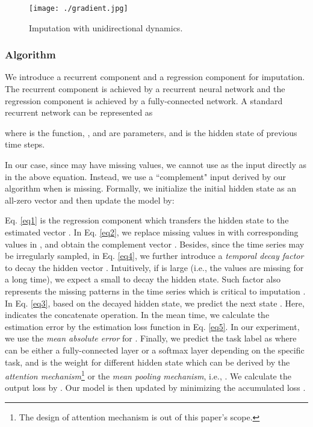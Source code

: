 \documentclass{article}
\begin{document}
\begin{figure}[t!]
\centering
\texttt{[image: ./gradient.jpg]}
\caption{Imputation with unidirectional dynamics.}
\label{fig:backpropagate}
\end{figure}



\subsubsection{Algorithm}
We introduce a recurrent component and a regression component for imputation. The recurrent component is achieved by a recurrent neural network and the regression component is achieved by a fully-connected network.
A standard recurrent network \cite{DeepBook} can be represented as 

where  is the  function, ,  and  are parameters, and  is the hidden state of previous time steps.

In our case, since  may have missing values, we cannot use  as the input directly as in the above equation. Instead,  we use a ``complement" input  derived by our algorithm when  is missing. Formally,
we  initialize the initial hidden state  as an all-zero vector and then update the model by: 


Eq. \eqref{eq1} is the regression component which transfers the hidden state  to the estimated vector . In Eq. \eqref{eq2}, we replace missing values in  with corresponding values in , and obtain the complement vector . Besides, since the time series may be irregularly sampled, in Eq. \eqref{eq4}, we further introduce a {\em temporal decay factor}  to decay the hidden vector . Intuitively, if  is large (i.e., the values are missing for a long time), we expect a small  to decay the hidden state.
Such factor also represents the missing patterns in the time series which is critical to imputation \cite{che2018recurrent}. In Eq. \eqref{eq3}, based on the decayed hidden state, we predict the next state . Here, 
 indicates the concatenate operation.
In the mean time, we calculate the estimation error by the estimation loss function  in Eq. \eqref{eq5}. In our experiment, we use the {\em mean absolute error} for . Finally, we predict the task label  as
 where  can be either a fully-connected layer or a softmax layer depending on the specific task, and  is the weight for different hidden state which can be derived by the {\em attention mechanism}\footnote{The design of attention mechanism is out of this paper's scope.}  or the {\em mean pooling mechanism}, i.e., . We calculate the output loss by  . Our model is then updated by minimizing the accumulated loss .
\end{document}
